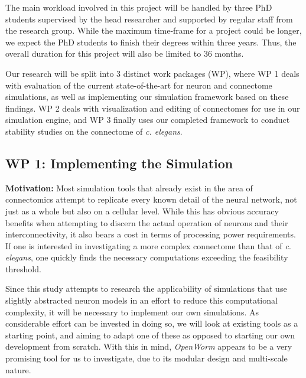 \documentclass[a4paper,11pt]{article}
\begin{document}
The main workload involved in this project will be handled by three PhD students
supervised by the head researcher and supported by regular staff from the research group.
While the maximum time-frame for a project could be longer, we expect the PhD students to finish their degrees within three years. Thus, the overall duration for this project will also be limited to 36 months.

Our research will be split into 3 distinct work packages (WP), where WP 1 deals with evaluation of the current state-of-the-art for neuron and connectome simulations, as well as implementing our simulation framework based on these findings. WP 2 deals with visualization and editing of connectomes for use in our simulation engine, and WP 3 finally uses our completed framework to conduct stability studies on the connectome of \emph{c. elegans}.


\subsection{WP 1: Implementing the Simulation}

\textbf{Motivation:}
Most simulation tools that already exist in the area of connectomics attempt to replicate every known detail of the neural network, not just as a whole but also on a cellular level. While this has obvious accuracy benefits when attempting to discern the actual operation of neurons and their interconnectivity, it also bears a cost in terms of processing power requirements. If one is interested in investigating a more complex connectome than that of \emph{c. elegans}, one quickly finds the necessary computations exceeding the feasibility threshold.

Since this study attempts to research the applicability of simulations that use slightly abstracted neuron models in an effort to reduce this computational complexity, it will be necessary to implement our own simulations. As considerable effort can be invested in doing so, we will look at existing tools as a starting point, and aiming to adapt one of these as opposed to starting our own development from scratch. With this in mind, \emph{OpenWorm} \citep{Szigeti2014} appears to be a very promising tool for us to investigate, due to its modular design and multi-scale nature.
\end{document}
